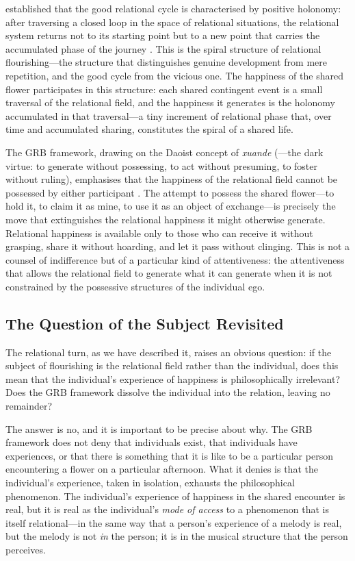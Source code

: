   established that the good relational cycle is characterised by positive holonomy: after traversing a closed loop in the space of relational situations, the relational system returns not to its starting point but to a new point that carries the accumulated phase of the journey \parencite{paperix}. This is the spiral structure of relational flourishing---the structure that distinguishes genuine development from mere repetition, and the good cycle from the vicious one. The happiness of the shared flower participates in this structure: each shared contingent event is a small traversal of the relational field, and the happiness it generates is the holonomy accumulated in that traversal---a tiny increment of relational phase that, over time and accumulated sharing, constitutes the spiral of a shared life.

 The GRB framework, drawing on the Daoist concept of \emph{xuande} (---the dark virtue: to generate without possessing, to act without presuming, to foster without ruling), emphasises that the happiness of the relational field cannot be possessed by either participant \parencite{laozi1963}. The attempt to possess the shared flower---to hold it, to claim it as mine, to use it as an object of exchange---is precisely the move that extinguishes the relational happiness it might otherwise generate. Relational happiness is available only to those who can receive it without grasping, share it without hoarding, and let it pass without clinging. This is not a counsel of indifference but of a particular kind of attentiveness: the attentiveness that allows the relational field to generate what it can generate when it is not constrained by the possessive structures of the individual ego.

\subsection{The Question of the Subject Revisited}
\label{p14:subsec:subject}

\noindent
The relational turn, as we have described it, raises an obvious question: if the subject of flourishing is the relational field rather than the individual, does this mean that the individual's experience of happiness is philosophically irrelevant? Does the GRB framework dissolve the individual into the relation, leaving no remainder?

The answer is no, and it is important to be precise about why. The GRB framework does not deny that individuals exist, that individuals have experiences, or that there is something that it is like to be a particular person encountering a flower on a particular afternoon. What it denies is that the individual's experience, taken in isolation, exhausts the philosophical phenomenon. The individual's experience of happiness in the shared encounter is real, but it is real as the individual's \emph{mode of access} to a phenomenon that is itself relational---in the same way that a person's experience of a melody is real, but the melody is not \emph{in} the person; it is in the musical structure that the person perceives.

